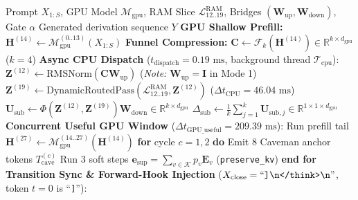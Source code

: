 \documentclass[10pt,twocolumn]{article}
\begin{document}
\begin{algorithm}[t]
\caption{Asynchronous Subconscious Latent Offloading}
\label{alg:offload}
\footnotesize
\begin{algorithmic}[1]
\REQUIRE Prompt $X_{1:S}$, GPU Model $\mathcal{M}_{\text{gpu}}$, RAM Slice $\mathcal{L}_{12..19}^{\text{RAM}}$, Bridges $(\mathbf{W}_{\text{up}}, \mathbf{W}_{\text{down}})$, Gate $\alpha$
\ENSURE Generated derivation sequence $Y$
\STATE \textbf{GPU Shallow Prefill:} $\mathbf{H}^{(14)} \leftarrow \mathcal{M}_{\text{gpu}}^{(0..13)}(X_{1:S})$
\STATE \textbf{Funnel Compression:} $\mathbf{C} \leftarrow \mathcal{F}_k(\mathbf{H}^{(14)}) \in \mathbb{R}^{k \times d_{\text{gpu}}}$ ($k=4$)
\STATE \textbf{Async CPU Dispatch} ($t_{\text{dispatch}} = 0.19\text{ ms}$, background thread $\mathcal{T}_{\text{cpu}}$):
\STATE \hspace{0.7em} $\mathbf{Z}^{(12)} \leftarrow \text{RMSNorm}(\mathbf{C} \mathbf{W}_{\text{up}})$ \quad (\emph{Note:} $\mathbf{W}_{\text{up}} = \mathbf{I}$ in Mode 1)
\STATE \hspace{0.7em} $\mathbf{Z}^{(19)} \leftarrow \text{DynamicRoutedPass}(\mathcal{L}_{12..19}^{\text{RAM}}, \mathbf{Z}^{(12)})$ \quad ($\Delta t_{\text{CPU}} = 46.04\text{ ms}$)
\STATE \hspace{0.7em} $\mathbf{U}_{\text{sub}} \leftarrow \Phi(\mathbf{Z}^{(12)}, \mathbf{Z}^{(19)}) \mathbf{W}_{\text{down}} \in \mathbb{R}^{k \times d_{\text{gpu}}}$
\STATE \hspace{0.7em} $\Delta_{\text{sub}} \leftarrow \frac{1}{k}\sum_{j=1}^k \mathbf{U}_{\text{sub}, j} \in \mathbb{R}^{1 \times 1 \times d_{\text{gpu}}}$
\STATE \textbf{Concurrent Useful GPU Window} ($\Delta t_{\text{GPU\_useful}} = 209.39\text{ ms}$):
\STATE \hspace{0.7em} Run prefill tail $\mathbf{H}^{(27)} \leftarrow \mathcal{M}_{\text{gpu}}^{(14..27)}(\mathbf{H}^{(14)})$
\STATE \hspace{0.7em} \textbf{for} cycle $c = 1, 2$ \textbf{do}
\STATE \hspace{1.4em} Emit $8$ Caveman anchor tokens $T_{\text{cave}}^{(c)}$
\STATE \hspace{1.4em} Run $3$ soft steps $\mathbf{e}_{\text{sup}} = \sum_{v \in \mathcal{K}} p_v \mathbf{E}_v$ (\texttt{preserve\_kv})
\STATE \hspace{0.7em} \textbf{end for}
\STATE \textbf{Transition Sync \& Forward-Hook Injection} ($X_{\text{close}} = \text{``\texttt{]\textbackslash n</think>\textbackslash n}''}$, token $t=0$ is ``\texttt{]}''):

\end{algorithmic}
\end{algorithm}
\end{document}
